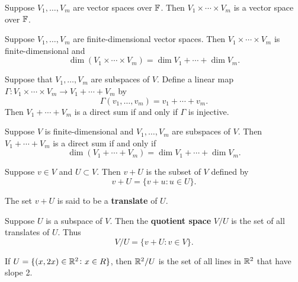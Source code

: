 \documentclass{extarticle}
\begin{document}
\begin{thm}
    Suppose \(V_1, \ldots, V_m\) are vector spaces over \(\mathbb{F}\). Then \(V_1 \times \cdots \times V_m\)
    is a vector space over \(\mathbb{F}\). 
\end{thm}

\begin{thm}
    Suppose \(V_1, \ldots, V_m\) are finite-dimensional vector spaces. Then \(V_1 \times \cdots \times 
    V_m\) is finite-dimensional and 
    \[\dim (V_1 \times \cdots \times V_m) = \dim V_1 + \cdots + \dim V_m.\]
\end{thm}

\begin{lemma}
    Suppose that \(V_1, \ldots, V_m\) are subspaces of \(V\). Define a linear map \(\Gamma \colon 
    V_1 \times \cdots \times V_m \to V_1 + \cdots + V_m \) by
    \[\Gamma (v_1, \ldots, v_m) = v_1 + \cdots + v_m.\]
    Then \(V_1 + \cdots + V_m\) is a direct sum if and only if \(\Gamma\) is injective. 
\end{lemma}

\begin{thm}
    Suppose \(V\) is finite-dimensional and \(V_1, \ldots, V_m\) are subspaces of \(V\). Then 
    \(V_1 + \cdots + V_m\) is a direct sum if and only if 
    \[\dim(V_1 + \cdots + V_m) = \dim V_1 + \cdots + \dim V_m.\]
\end{thm}

\begin{definition}[\(v + U\), translation]
    Suppose \(v \in V\) and \(U \subset V\). Then \(v + U\) is the subset of \(V\) defined by 
    \[v + U = \{v + u \colon  u \in U\}.\]

    The set \(v + U\) is said to be a \textbf{translate} of \(U\).
\end{definition}

\begin{definition}
    Suppose \(U\) is a subspace of \(V\). Then the \textbf{quotient space} \(V / U\) is the set of 
    all translates of \(U\). Thus 
    \[V / U = \{v + U \colon v \in V\}.\]
\end{definition}

\begin{remark}
    If \(U = \{(x, 2x) \in \mathbb{R}^2 \colon x \in R\}\), then \(\mathbb{R}^2 / U\) is the set of all lines in 
    \(\mathbb{R}^2\) that have slope 2. 
\end{remark}
\end{document}
